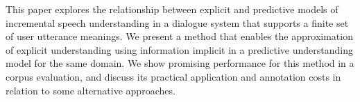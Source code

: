 This paper explores the relationship between explicit and predictive models of incremental speech understanding in a dialogue system that supports a finite
 set of user utterance meanings. We present a method that enables the
 approximation of explicit understanding using information implicit in a
 predictive understanding model for the same domain. We show promising
 performance for this method in a corpus evaluation, and discuss its practical
 application and annotation costs in relation to some alternative approaches.

